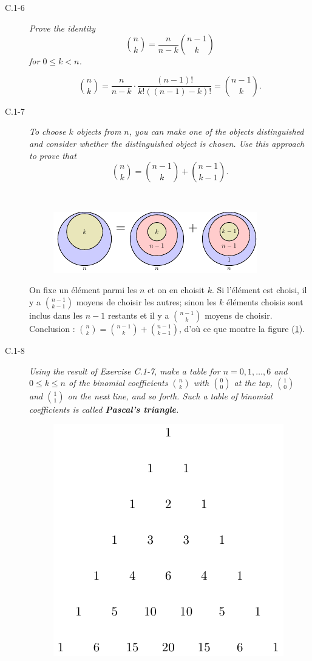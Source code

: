 \begin{description}
  \item[C.1-6] {\itshape Prove the identity \[\binom{n}{k} = \frac{n}{n-k}\binom{n-1}{k}\] for $ 0 \le k < n$.}
    \begin{ex}
      \[ \binom{n}{k} = \frac{n}{n-k}\cdot\frac{(n-1)!}{k!((n-1)-k)!} = \binom{n-1}{k}.\]
    \end{ex}
  \item[C.1-7] {\itshape To choose $k$ objects from $n$, you can make one of the objects distinguished and consider whether the distinguished object is chosen. Use this approach to prove that \[\binom{n}{k} = \binom{n-1}{k}+\binom{n-1}{k-1}.\]}
    \begin{ex}\mbox{}\\ %
      {
        \begin{figure}[H]
          \centering
        \includegraphics[scale=1.5]{img/C_1-7/C_1-7.pdf}
        \caption{}
          \label{fig:C.1-7}
        \end{figure}
      }
      On fixe un \'el\'ement parmi les $n$ et on en choisit $k$. Si l'\'el\'ement est choisi, il y a $\binom{n-1}{k-1}$ moyens de choisir les autres; sinon les $k$ \'el\'ements choisis sont inclus dans les $n-1$ restants et il y a $\binom{n-1}{k}$ moyens de choisir.
    Conclusion : $ \binom{n}{k} = \binom{n-1}{k}+\binom{n-1}{k-1}$, d'o\`u ce que montre la figure (\ref{fig:C.1-7}).     
    \end{ex}
  \item[C.1-8] {\itshape Using the result of Exercise C.1-7, make a table for $n = 0, 1, \ldots, 6$ and $ 0\le k \le n$ of the binomial coefficients $\binom{n}{k}$ with $\binom{0}{0}$ at the top, $\binom{1}{0}$ and $\binom{1}{1}$ on the next line, and so forth. Such a table of binomial coefficients is called \textbf{Pascal’s triangle}.}
    \begin{ex}\mbox{}
      \begin{figure}[H]
        \centering
        \includegraphics{img/C_1-8/C_1-8.pdf}

\end{figure}
\end{ex}
\end{description}
